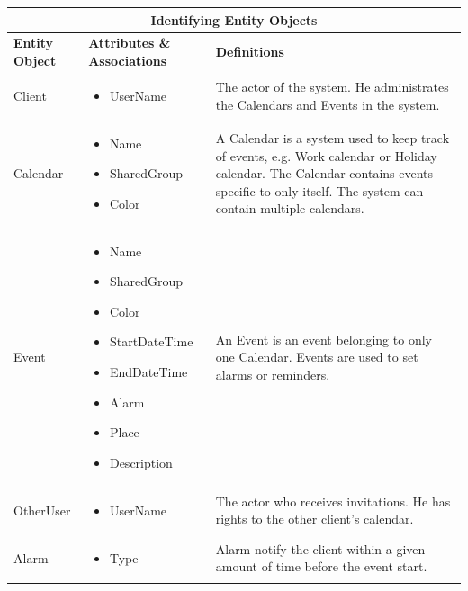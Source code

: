 \begin{tabular}{|l|p{5.3cm}|p{5.3cm}|}
\hline
\multicolumn{3}{|c|}{Identifying Entity Objects} \\
\hline
\textbf{Entity Object} & \textbf{Attributes \& Associations} & \textbf{Definitions} \\
\hline
 Client & 
\begin{itemize}
     \item UserName
\end{itemize} &
The actor of the system. He administrates the Calendars and Events in the system. \\ \hline
Calendar & 
\begin{itemize}
	\item Name
	\item SharedGroup
	\item Color
  \end{itemize} & 
A Calendar is a system used to keep track of events, e.g. Work calendar or Holiday calendar. The Calendar contains events specific to only itself. The system can contain multiple calendars.\\ \hline
Event &
\begin{itemize}
	\item Name
	\item SharedGroup
	\item Color
	\item StartDateTime
	\item EndDateTime
	\item Alarm
	\item Place
	\item Description
\end{itemize} &
An Event is an event belonging to only one Calendar. Events are used to set alarms or reminders. \\ \hline
OtherUser & 
\begin{itemize} 
	\item UserName 
\end{itemize} & 
The actor who receives invitations. He has rights to the other client’s calendar. \\ \hline
Alarm &
\begin{itemize} 
	\item Type
\end{itemize} &
Alarm notify the client within a given amount of time before the event start.  \\ \hline
\end{tabular}

